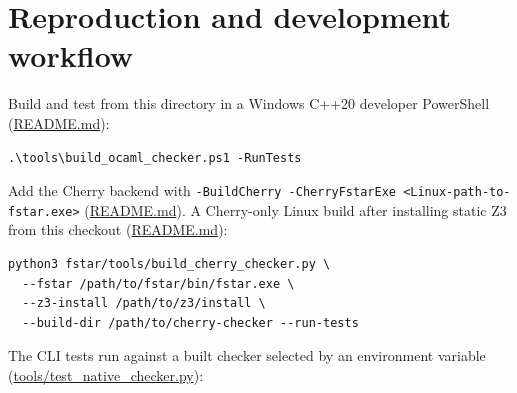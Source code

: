 \documentclass[10pt,a4paper]{article}
\begin{document}
\section{Reproduction and development workflow}\label{sec:8-reproduction-and-development-workflow}

Build and test from this directory in a Windows C++20 developer PowerShell (\href{https://github.com/Z3Prover/z3/blob/8fbb275aba0472e862e289c7af1331b3bd5d512c/fstar/README.md\#L45-L50}{README.\allowbreak{}md}):

\begin{lstlisting}[basicstyle=\ttfamily\footnotesize,breaklines=true,breakatwhitespace=false,columns=fullflexible,keepspaces=true,showstringspaces=false,breakindent=1.5em,postbreak=\mbox{\textcolor{gray}{$\hookrightarrow$}\space},frame=single,rulecolor=\color{lightgray},xleftmargin=2pt,xrightmargin=2pt,aboveskip=6pt,belowskip=6pt]
.\tools\build_ocaml_checker.ps1 -RunTests
\end{lstlisting}

Add the Cherry backend with \texttt{-{}\allowbreak{}BuildCherry -{}\allowbreak{}CherryFstarExe <Linux-{}\allowbreak{}path-{}\allowbreak{}to-{}\allowbreak{}fstar.\allowbreak{}exe>} (\href{https://github.com/Z3Prover/z3/blob/8fbb275aba0472e862e289c7af1331b3bd5d512c/fstar/README.md\#L77-L81}{README.\allowbreak{}md}). A Cherry-only Linux build after installing static Z3 from this checkout (\href{https://github.com/Z3Prover/z3/blob/8fbb275aba0472e862e289c7af1331b3bd5d512c/fstar/README.md\#L83-L92}{README.\allowbreak{}md}):

\begin{lstlisting}[basicstyle=\ttfamily\footnotesize,breaklines=true,breakatwhitespace=false,columns=fullflexible,keepspaces=true,showstringspaces=false,breakindent=1.5em,postbreak=\mbox{\textcolor{gray}{$\hookrightarrow$}\space},frame=single,rulecolor=\color{lightgray},xleftmargin=2pt,xrightmargin=2pt,aboveskip=6pt,belowskip=6pt]
python3 fstar/tools/build_cherry_checker.py \
  --fstar /path/to/fstar/bin/fstar.exe \
  --z3-install /path/to/z3/install \
  --build-dir /path/to/cherry-checker --run-tests
\end{lstlisting}

The CLI tests run against a built checker selected by an environment variable (\href{https://github.com/Z3Prover/z3/blob/8fbb275aba0472e862e289c7af1331b3bd5d512c/fstar/tools/test_native_checker.py\#L283-L288}{tools/\allowbreak{}test\_\allowbreak{}native\_\allowbreak{}checker.\allowbreak{}py}):
\end{document}
